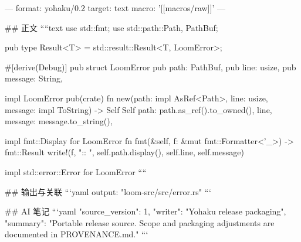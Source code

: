 ---
format: yohaku/0.2
target: text
macro: '[[macros/raw]]'
---

## 正文
````text
use std::fmt;
use std::path::{Path, PathBuf};

pub type Result<T> = std::result::Result<T, LoomError>;

#[derive(Debug)]
pub struct LoomError {
    pub path: PathBuf,
    pub line: usize,
    pub message: String,
}

impl LoomError {
    pub(crate) fn new(path: impl AsRef<Path>, line: usize, message: impl ToString) -> Self {
        Self {
            path: path.as_ref().to_owned(),
            line,
            message: message.to_string(),
        }
    }
}

impl fmt::Display for LoomError {
    fn fmt(&self, f: &mut fmt::Formatter<'_>) -> fmt::Result {
        write!(f, "{}:{}: {}", self.path.display(), self.line, self.message)
    }
}

impl std::error::Error for LoomError {}
````

## 输出与关联
```yaml
output: "loom-src/src/error.rs"
```

## AI 笔记
```yaml
{"source_version": 1, "writer": "Yohaku release packaging", "summary": "Portable release source. Scope and packaging adjustments are documented in PROVENANCE.md."}
```
